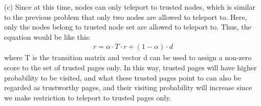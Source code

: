 \documentclass[draftcls,12pt,onecolumn]{IEEEtran}
\begin{document}
(c) Since at this time, nodes can only teleport to trusted nodes, which is similar to the previous problem that only two nodes are allowed to teleport to. Here, only the nodes belong to trusted node set are allowed to teleport to. Thus, the equation would be like this:
\begin{align*}
 r = \alpha \cdot T \cdot r + (1 - \alpha) \cdot d
 \end{align*}
where T is the transition matrix and vector d can be used to assign a non-zero score to the set of trusted pages only. In this way, trusted pages will have higher probability to be visited, and what these trusted pages point to can also be regarded as trustworthy pages, and their visiting probability will increase since we make restriction to teleport to trusted pages only. 



\end{document}
